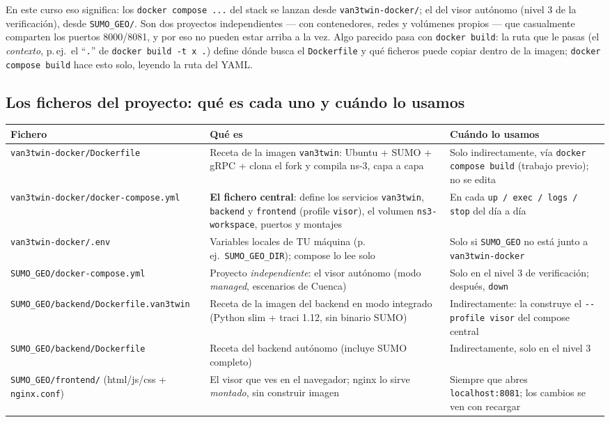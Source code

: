\documentclass[11pt,a4paper]{article}
\begin{document}
En este curso eso significa: los \texttt{docker compose ...} del stack se
lanzan desde \texttt{van3twin-docker/}; el del visor autónomo (nivel 3 de la
verificación), desde \texttt{SUMO\_GEO/}. Son dos proyectos independientes
--- con contenedores, redes y volúmenes propios --- que casualmente comparten
los puertos 8000/8081, y por eso no pueden estar arriba a la vez. Algo
parecido pasa con \texttt{docker build}: la ruta que le pasas (el
\emph{contexto}, p.\,ej.\ el ``\texttt{.}'' de \texttt{docker build -t x .})
define dónde busca el \texttt{Dockerfile} y qué ficheros puede copiar dentro
de la imagen; \texttt{docker compose build} hace esto solo, leyendo la ruta
del YAML.

\subsection{Los ficheros del proyecto: qué es cada uno y cuándo lo usamos}

\begin{center}
\small
\begin{tabular}{@{}p{}p{}p{}@{}}
\toprule
\textbf{Fichero} & \textbf{Qué es} & \textbf{Cuándo lo usamos} \\
\midrule
\texttt{van3twin-docker/Dockerfile} & Receta de la imagen \texttt{van3twin}: Ubuntu + SUMO + gRPC + clona el fork y compila ns-3, capa a capa & Solo indirectamente, vía \texttt{docker compose build} (trabajo previo); no se edita \\
\texttt{van3twin-docker/docker-compose.yml} & \textbf{El fichero central}: define los servicios \texttt{van3twin}, \texttt{backend} y \texttt{frontend} (profile \texttt{visor}), el volumen \texttt{ns3-workspace}, puertos y montajes & En cada \texttt{up / exec / logs / stop} del día a día \\
\texttt{van3twin-docker/.env} & Variables locales de TU máquina (p.\,ej.\ \texttt{SUMO\_GEO\_DIR}); compose lo lee solo & Solo si \texttt{SUMO\_GEO} no está junto a \texttt{van3twin-docker} \\
\texttt{SUMO\_GEO/docker-compose.yml} & Proyecto \emph{independiente}: el visor autónomo (modo \emph{managed}, escenarios de Cuenca) & Solo en el nivel 3 de verificación; después, \texttt{down} \\
\texttt{SUMO\_GEO/backend/Dockerfile.van3twin} & Receta de la imagen del backend en modo integrado (Python slim + traci 1.12, sin binario SUMO) & Indirectamente: la construye el \texttt{-{}-profile visor} del compose central \\
\texttt{SUMO\_GEO/backend/Dockerfile} & Receta del backend autónomo (incluye SUMO completo) & Indirectamente, solo en el nivel 3 \\
\texttt{SUMO\_GEO/frontend/} (html/js/css + \texttt{nginx.conf}) & El visor que ves en el navegador; nginx lo sirve \emph{montado}, sin construir imagen & Siempre que abres \texttt{localhost:8081}; los cambios se ven con recargar \\
\bottomrule
\end{tabular}
\end{center}
\end{document}
